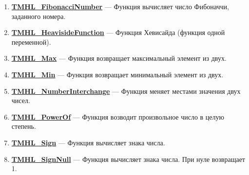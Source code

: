 \documentclass[a4paper,12pt]{article}
\begin{document}
\begin{enumerate}
\item \textbf{\hyperref[TMHL_FibonacciNumber]{TMHL\_FibonacciNumber}} --- Функция вычисляет число Фибоначчи, заданного номера.

\item \textbf{\hyperref[TMHL_HeavisideFunction]{TMHL\_HeavisideFunction}} --- Функция Хевисайда (функция одной переменной).

\item \textbf{\hyperref[TMHL_Max]{TMHL\_Max}} --- Функция возвращает максимальный элемент из двух.

\item \textbf{\hyperref[TMHL_Min]{TMHL\_Min}} --- Функция возвращает минимальный элемент из двух.

\item \textbf{\hyperref[TMHL_NumberInterchange]{TMHL\_NumberInterchange}} --- Функция меняет местами значения двух чисел.

\item \textbf{\hyperref[TMHL_PowerOf]{TMHL\_PowerOf}} --- Функция возводит произвольное число в целую степень.

\item \textbf{\hyperref[TMHL_Sign]{TMHL\_Sign}} --- Функция вычисляет знака числа.

\item \textbf{\hyperref[TMHL_SignNull]{TMHL\_SignNull}} --- Функция вычисляет знака числа. При нуле возвращает 1.

\end{enumerate}
\end{document}
